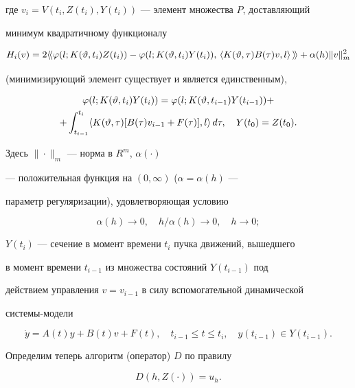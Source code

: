 где $v_i=V(t_i,Z(t_i),Y(t_i))$ --- элемент множества $P$, доставляющий 


минимум квадратичному функционалу 


$$ 


H_i(v)=2\lla\varphi(l;K(\vartheta,t_i)Z(t_i))- 


\varphi(l;K(\vartheta,t_i)Y(t_i)),\,\la K(\vartheta,\tau) 


B(\tau)v,l\ra\,\rra +\alpha(h)\|v\|^2_m 


$$ 


(минимизирующий элемент существует и является единственным), 


\begin{multline*} 


\varphi(l;K(\vartheta,t_i)Y(t_i))= 


\varphi(l;K(\vartheta,t_{i-1})Y(t_{i-1}))+ \\ 


+\int^{t_i}_{t_{i-1}}\la K(\vartheta,\tau)[B(\tau)v_{i-1} 


+F(\tau)],l\ra\,d\tau,\quad Y(t_0)=Z(t_0). 


\end{multline*} 


Здесь $\|\cdot\|_m$ --- норма в $R^m$, $\alpha(\cdot)$ 


--- положительная функция на $(0,\infty)$ ($\alpha=\alpha(h)$ --- 


параметр регуляризации), удовлетворяющая условию 


\begin{equation} 


\alpha(h)\to 0,\quad h/\alpha(h)\to 0,\quad h\to 0; 


\end{equation} 


$Y(t_i)$ --- сечение в момент времени $t_i$ пучка движений, вышедшего 


в момент времени $t_{i-1}$ из множества состояний $Y(t_{i-1})$ под 


действием управления $v=v_{i-1}$ в силу вспомогательной динамической 


системы-модели 


$$ 


\Dot y=A(t)y+B(t)v+F(t),\quad t_{i-1}\le t\le t_i,\quad 


y(t_{i-1})\in Y(t_{i-1}). 


$$ 


Определим теперь алгоритм (оператор) $D$ по правилу 


\begin{equation} 


D(h,Z(\cdot))=u_h. 


\end{equation} 


